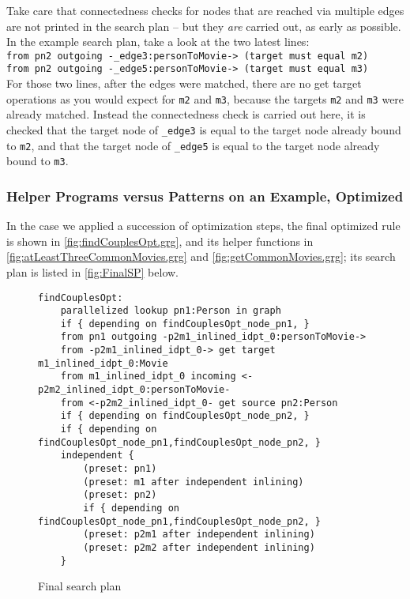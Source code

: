 Take care that connectedness checks for nodes that are reached via multiple edges are not printed in the search plan -- but they \emph{are} carried out, as early as possible.
In the example search plan, take a look at the two latest lines:\\
\verb#from pn2 outgoing -_edge3:personToMovie-> (target must equal m2)#\\
\verb#from pn2 outgoing -_edge5:personToMovie-> (target must equal m3)#\\
For those two lines, after the edges were matched, there are no get target operations as you would expect for \texttt{m2} and \texttt{m3}, because the targets \texttt{m2} and \texttt{m3} were already matched.
Instead the connectedness check is carried out here, it is checked that the target node of \verb#_edge3# is equal to the target node already bound to \texttt{m2}, and that the target node of \verb#_edge5# is equal to the target node already bound to \texttt{m3}.

\subsubsection*{Helper Programs versus Patterns on an Example, Optimized}

In the case we applied a succession of optimization steps,
the final optimized rule is shown in \autoref{fig:findCouplesOpt.grg}, and its helper functions in \autoref{fig:atLeastThreeCommonMovies.grg} and \autoref{fig:getCommonMovies.grg}; its search plan is listed in \autoref{fig:FinalSP} below.

\begin{figure}[hptb]
	\begin{verbatim}
findCouplesOpt:
    parallelized lookup pn1:Person in graph
    if { depending on findCouplesOpt_node_pn1, }
    from pn1 outgoing -p2m1_inlined_idpt_0:personToMovie->
    from -p2m1_inlined_idpt_0-> get target m1_inlined_idpt_0:Movie
    from m1_inlined_idpt_0 incoming <-p2m2_inlined_idpt_0:personToMovie-
    from <-p2m2_inlined_idpt_0- get source pn2:Person
    if { depending on findCouplesOpt_node_pn2, }
    if { depending on findCouplesOpt_node_pn1,findCouplesOpt_node_pn2, }
    independent {
        (preset: pn1)
        (preset: m1 after independent inlining)
        (preset: pn2)
        if { depending on findCouplesOpt_node_pn1,findCouplesOpt_node_pn2, }
        (preset: p2m1 after independent inlining)
        (preset: p2m2 after independent inlining)
    }
    \end{verbatim}
	\caption{Final search plan}
	\label{fig:FinalSP}
\end{figure}

